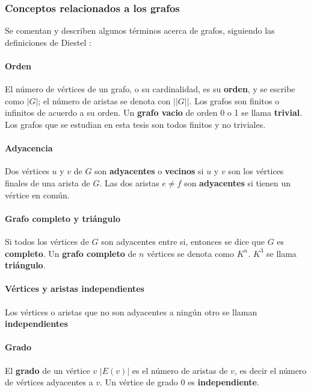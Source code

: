 \subsubsection{Conceptos relacionados a los grafos}

Se comentan y describen algunos términos acerca de grafos, siguiendo las definiciones de Diestel \cite{Diestel2005GraphTheory}:

\paragraph{Orden}
El número de vértices de un grafo, o su cardinalidad, es su \textbf{orden}, y se escribe como $|G|$; el número de aristas se denota con $||G||$. Los grafos son finitos o infinitos de acuerdo a su orden. Un \textbf{grafo vacio} de orden 0 o 1 se llama \textbf{trivial}. Los grafos que se estudian en esta tesis son todos finitos y no triviales.

\paragraph{Adyacencia}
Dos vértices $u$ y $v$ de $G$ son \textbf{adyacentes} o \textbf{vecinos} si $u$ y $v$ son los vértices finales de una arista de $G$. Las dos aristas $e\neq f$ son \textbf{adyacentes} si tienen un vértice en común. 

\paragraph{Grafo completo y triángulo}
Si todos los vértices de $G$ son adyacentes entre si, entonces se dice que $G$ es \textbf{completo}. Un \textbf{grafo completo} de $n$ vértices se denota como $K^{n}$. $K^{3}$ se llama \textbf{triángulo}.

\paragraph{Vértices y aristas independientes}
Los vértices o aristas que no son adyacentes a ningún otro se llaman \textbf{independientes}

\paragraph{Grado}
El \textbf{grado} de un vértice $v$ $|E(v)|$ es el número  de aristas de $v$, es decir el número de vértices adyacentes a $v$. Un vértice de grado 0 es \textbf{independiente}.


